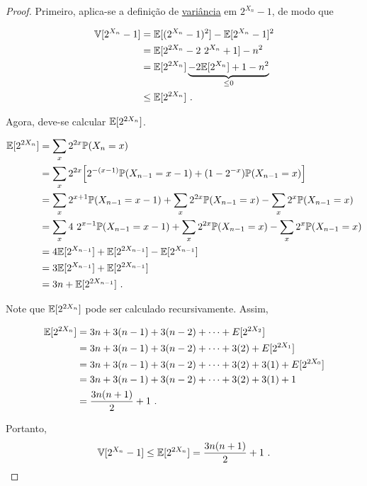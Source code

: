 \begin{proof}
Primeiro, aplica-se a definição de \hyperref[ap:variance]{variância} em $2^{X_n} - 1$, de modo que

\begin{align*}
  \mathbb{V}[2^{X_n} - 1] 
    &= \mathbb{E}[(2^{X_n} - 1) ^ 2] - \mathbb{E}[2^{X_n} - 1]^2  \\
    &= \mathbb{E}[2^{2X_n} -2 \ 2^{X_n} + 1] - n^2 \\
    &= \mathbb{E}[2^{2X_n}] \underbrace{-2 \mathbb{E} [2^{X_n}] + 1 - n^2}_{\leq 0} \\ 
    &\leq \mathbb{E}[2^{2X_n}] \ .
\end{align*}

Agora, deve-se calcular $\mathbb{E}[2^{2X_n}]$.

\begin{align*}
  \mathbb{E}[2^{2X_n}]  
    &=  \sum_{x} 2^{2x} \mathbb{P}(X_n = x) \\
    &=  \sum_{x} 2^{2x} \Big[ 2^{-(x-1)} \mathbb{P}(X_{n-1} = x-1) + (1 - 2^{-x}) \mathbb{P}(X_{n-1} = x) \Big] \\
    &=  \sum_{x} 2^{x+1} \mathbb{P}(X_{n-1} = x-1) + \sum_{x} 2^{2x} \mathbb{P}(X_{n-1} = x) - \sum_{x} 2^{x} \mathbb{P}(X_{n-1} = x) \\
    &=  \sum_{x} 4 \ 2^{x-1} \mathbb{P}(X_{n-1} = x-1) + \sum_{x} 2^{2x} \mathbb{P}(X_{n-1} = x) - \sum_{x} 2^{x} \mathbb{P}(X_{n-1} = x)  \\
    &=  4 \mathbb{E}[2^{X_{n-1}}] + \mathbb{E}[2^{2X_{n-1}}] - \mathbb{E}[2^{X_{n-1}}]  \\
    &=  3 \mathbb{E}[2^{X_{n-1}}] + \mathbb{E}[2^{2X_{n-1}}]  \\
    &=  3 n + \mathbb{E}[2^{2X_{n-1}}] \ . \\
\end{align*}

Note que $\mathbb{E}[2^{2X_n}]$ pode ser calculado recursivamente. Assim,

\begin{align*}
  \mathbb{E}[2^{2X_{n}}] 
    &= 3n + 3(n-1) + 3(n-2) + \dots + E[2^{2X_2}] \\
    &= 3n + 3(n-1) + 3(n-2) + \dots + 3 (2) + E[2^{2X_1}] \\
    &= 3n + 3(n-1) + 3(n-2) + \dots + 3 (2) + 3 (1) + E[2^{2X_0}] \\
    &= 3n + 3(n-1) + 3(n-2) + \dots + 3 (2) + 3 (1) + 1 \\
    &= \frac{3n(n+1)}{2} + 1 \ .
\end{align*}

Portanto, 
\[ \mathbb{V}[2^{X_n} - 1] \leq \mathbb{E}[2^{2X_n}] = \frac{3n(n+1)}{2} + 1 \ .\]

\end{proof}

